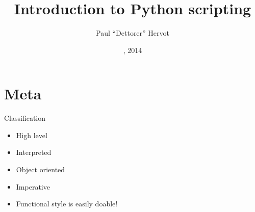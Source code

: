 \documentclass[ignorenonframetext,]{beamer}
\title{Introduction to Python scripting}
\author{Paul ``Dettorer'' Hervot}
\date{, 2014}
\begin{document}
\frame{\titlepage}

\section{Meta}\label{meta}

\begin{frame}{Classification}
    \begin{itemize}
        \item High level
        \item Interpreted
        \item Object oriented
        \item Imperative
        \item Functional style is easily doable!
    \end{itemize}
\end{frame}
\end{document}
